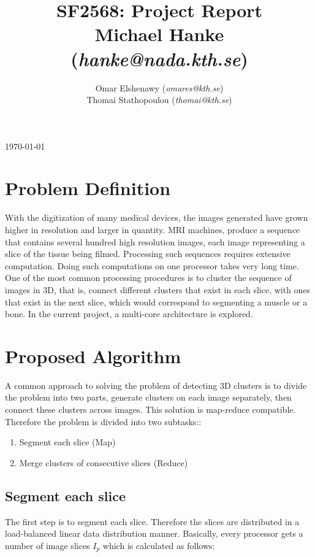 \documentclass[a4paper,12pt]{article}
\title{SF2568: Project Report \\ Michael Hanke (\textit{hanke@nada.kth.se})}
\author{\hspace*{-0.5cm}
  \begin{tabular}{cc}
  Omar Elshenawy (\textit{omares@kth.se})\\ Thomai Stathopoulou (\textit{thomai@kth.se}) \\ 
  \end{tabular}
}
\date{}
\begin{document}
	\maketitle
	

\thispagestyle{empty}	%


\vfill
\begin{center}
	\today
\end{center}
\clearpage		%
	
	
\section{Problem Definition}
With the digitization of many medical devices, the images generated have grown higher in resolution and larger in quantity. MRI machines, produce a sequence that contains several hundred high resolution images, each image representing a slice of the tissue being filmed. Processing such sequences requires extensive computation. Doing such computations on one processor takes very long time. One of the most common processing procedures is to cluster the sequence of images in 3D, that is, connect different clusters that exist in each slice, with ones that exist in the next slice, which would correspond to segmenting a muscle or a bone. In the current project, a multi-core architecture is explored.
		
	\section{Proposed Algorithm}\label{sec:alg}
A common approach to solving the problem of detecting 3D clusters is to divide the problem into two parts, generate clusters on each image separately, then connect these clusters across images. This solution is map-reduce compatible. Therefore the problem is divided into two subtasks::
		\begin{enumerate}
			\item Segment each slice (Map) \label{task:1}
			\item Merge clusters of consecutive slices (Reduce) \label{task:2}
		\end{enumerate}
		\subsection{Segment each slice}
The first step is to segment each slice. Therefore the slices are distributed in a load-balanced linear data distribution manner. Basically, every processor gets a number of image slices $I_p$ which is calculated as follows:
			
\end{document}
